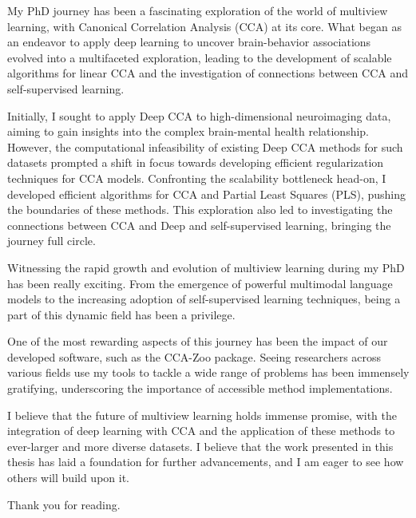 My PhD journey has been a fascinating exploration of the world of multiview learning, with Canonical Correlation Analysis (CCA) at its core. What began as an endeavor to apply deep learning to uncover brain-behavior associations evolved into a multifaceted exploration, leading to the development of scalable algorithms for linear CCA and the investigation of connections between CCA and self-supervised learning.

Initially, I sought to apply Deep CCA to high-dimensional neuroimaging data, aiming to gain insights into the complex brain-mental health relationship. However, the computational infeasibility of existing Deep CCA methods for such datasets prompted a shift in focus towards developing efficient regularization techniques for CCA models. Confronting the scalability bottleneck head-on, I developed efficient algorithms for CCA and Partial Least Squares (PLS), pushing the boundaries of these methods. This exploration also led to investigating the connections between CCA and Deep and self-supervised learning, bringing the journey full circle.

Witnessing the rapid growth and evolution of multiview learning during my PhD has been really exciting. From the emergence of powerful multimodal language models to the increasing adoption of self-supervised learning techniques, being a part of this dynamic field has been a privilege.

One of the most rewarding aspects of this journey has been the impact of our developed software, such as the CCA-Zoo package. Seeing researchers across various fields use my tools to tackle a wide range of problems has been immensely gratifying, underscoring the importance of accessible method implementations.

I believe that the future of multiview learning holds immense promise, with the integration of deep learning with CCA and the application of these methods to ever-larger and more diverse datasets. I believe that the work presented in this thesis has laid a foundation for further advancements, and I am eager to see how others will build upon it.

Thank you for reading.